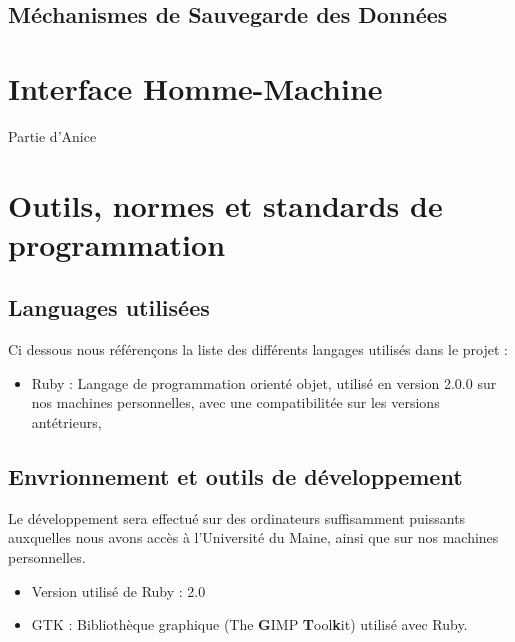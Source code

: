 \documentclass[11pt]{article}
\begin{document}
\subsection{Méchanismes de Sauvegarde des Données}



\newpage %

\section{Interface Homme-Machine}

Partie d'Anice

\newpage

\section{Outils, normes et standards de programmation}

\subsection{Languages utilisées}

Ci dessous nous référençons la liste des différents langages utilisés dans le projet : 

\begin{itemize}
	\item Ruby : Langage de programmation orienté objet, utilisé en version 2.0.0 sur nos machines personnelles, avec une compatibilitée sur les versions antétrieurs,
\end{itemize}

\subsection{Envrionnement et outils de développement}

Le développement sera effectué sur des ordinateurs suffisamment puissants auxquelles nous avons accès à l'Université du Maine, ainsi que sur nos machines personnelles.

\begin{itemize}
		\item Version utilisé de Ruby : 2.0
		\item GTK : Bibliothèque graphique (The \textbf{G}IMP \textbf{T}ool\textbf{k}it) utilisé avec Ruby.
\end{itemize}
\end{document}
